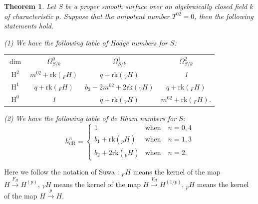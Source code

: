 \documentclass[a4paper,12pt,twoside]{report}
\newtheorem{theorem}{Theorem}[section]
\newcommand{\dR}{\mathrm{dR}}
\newcommand{\HH}{\mathrm{H}}
\newcommand{\rk}{\mathrm{rk}}
\begin{document}
\begin{theorem}\label{HodgeofSurfaceT02}
    Let $S$ be a proper smooth surface over an algebraically closed field $k$ of characteristic $p$. 
    Suppose that the unipotent number $T^{02}=0$, then the following statements hold.

    {\rm (1)}
    We have the following table of Hodge numbers for $S$:
    \begin{center}{\rm\label{Hodgetable}
        \begin{tabular}{ c|c|c|c } 
         $\dim$    &   $\Omega^0_{S/k}$           & $\Omega^1_{S/k}$              & $\Omega^2_{S/k}$ \\
         $\HH^2$   &   $m^{02}+\mathrm{rk}(_FH)$ &     $q+\mathrm{rk}(_VH)$        &  1   \\
         $\HH^1$   &    $q+\mathrm{rk}(_FH)$      &$b_2-2m^{02}+2\mathrm{rk}(_VH)$&  $q+\mathrm{rk}(_FH)$ \\           
         $\HH^0$   &    1                         &     $q+\mathrm{rk}(_VH)$        &   $m^{02}+\mathrm{rk}(_FH)$.\\ 
        \end{tabular}}
    \end{center}

    {\rm (2)}  We have the following table of de Rham numbers for $S$: 
    \[h_{\dR}^n=\begin{cases}
        1           &\text{when}\quad n=0,4\\
        b_1+\rk(_pH)&\text{when} \quad n=1,3\\
        b_2+2\rk(_pH)&\text{when} \quad n=2.
    \end{cases}\]
\end{theorem}

Here we follow the notation of Suwa \cite{Su}: $_FH$ means the kernel of the map $H\xrightarrow{F_{H}}H^{(p)}$, 
$_VH$ means the kernel of the map $H\xrightarrow{V_{H}}H^{(1/p)}$, $_pH$ means the kernel of the map $H\xrightarrow{p}H$. 
\end{document}
